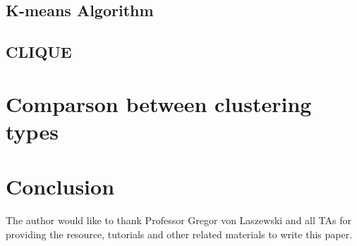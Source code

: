 \documentclass[sigconf]{acmart}
\begin{document}
\subsection{K-means Algorithm}
\subsection{CLIQUE}

\section{Comparson between clustering types}

\section{Conclusion}


\begin{acks}

The author would like to thank Professor Gregor von Laszewski and all TAs for providing the resource, tutorials and other related materials to write this paper.

\end{acks}




% 
\end{document}
